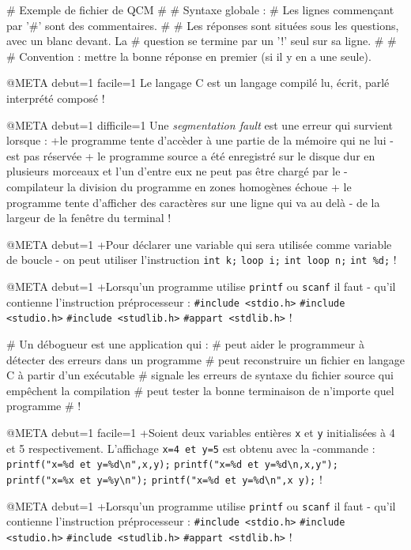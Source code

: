 # Exemple de fichier de QCM
#
# Syntaxe globale :
# Les lignes commençant par '#' sont des commentaires.
#
# Les réponses sont situées sous les questions, avec un blanc devant. La
# question se termine par un '!' seul sur sa ligne.
#
#
# Convention : mettre la bonne réponse en premier (si il y en a une seule).

@META debut=1 facile=1
Le langage C est un langage
 compilé
 lu, écrit, parlé
 interprété
 composé
!

@META debut=1 difficile=1
Une \emph{segmentation fault} est une erreur qui survient lorsque :
+le programme tente d'accèder à une partie de la mémoire qui ne lui
-est pas réservée
+ le programme source a été enregistré sur le disque dur en plusieurs
  morceaux et l'un d'entre eux ne peut pas être chargé par le
- compilateur
 la division du programme en zones homogènes échoue
+ le programme tente d'afficher des caractères sur une ligne qui va au delà
- de la largeur de la fenêtre du terminal
!

@META debut=1
+Pour déclarer une variable qui sera utilisée comme variable de boucle
- on peut utiliser l'instruction
  \verb|int k;|
  \verb|loop i;|
  \verb|int loop n;|
  \verb|int %d;|
!

@META debut=1
+Lorsqu'un programme utilise \verb|printf| ou \verb|scanf| il faut
- qu'il contienne l'instruction préprocesseur :
 \verb|#include <stdio.h>|
 \verb|#include <studio.h>|
 \verb|#include <studlib.h>|
 \verb|#appart <stdlib.h>|
!



# Un débogueur est une application qui :
#  peut aider le programmeur à détecter des erreurs dans un programme
#  peut reconstruire un fichier en langage C à partir d'un exécutable
#  signale les erreurs de syntaxe du fichier source qui empêchent la compilation 
#  peut tester la bonne terminaison de n'importe quel programme
# !

@META debut=1 facile=1
+Soient deux variables entières \verb|x| et \verb|y| initialisées à
4 et 5 respectivement. L'affichage \verb|x=4 et y=5| est obtenu avec la
-commande :
 \verb|printf("x=%d et y=%d\n",x,y);|
 \verb|printf("x=%d et y=%d\n,x,y");|
 \verb|printf("x=%x et y=%y\n");|
 \verb|printf("x=%d et y=%d\n",x y);|
!

@META debut=1
+Lorsqu'un programme utilise \verb|printf| ou \verb|scanf| il faut
- qu'il contienne l'instruction préprocesseur :
 \verb|#include <stdio.h>|
 \verb|#include <studio.h>|
 \verb|#include <studlib.h>|
 \verb|#appart <stdlib.h>|
!


